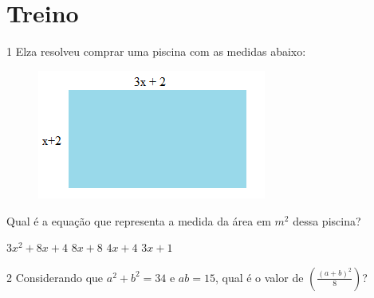 \section{Treino}

\num{1} Elza resolveu comprar uma piscina com as medidas abaixo:

\begin{figure}[H]
\centering\includegraphics[width=2.9625in,height=1.67014in]{./imgSAEB_8_MAT/media/image6.png}
\end{figure}

Qual é a equação que representa a medida da área em $m^2$ dessa piscina?

\begin{boxlist}
 $3x^2 + $$8x + 4$
\boxitem{} $8x + 8$
\boxitem{} $4x + 4$
\boxitem{} $3x + 1$
\end{boxlist}












\num{2} Considerando que $a^2+ b^2 = 34$ e $ab= 15$, qual é o valor de
$(\frac{(a + b)^2}{8})$?

